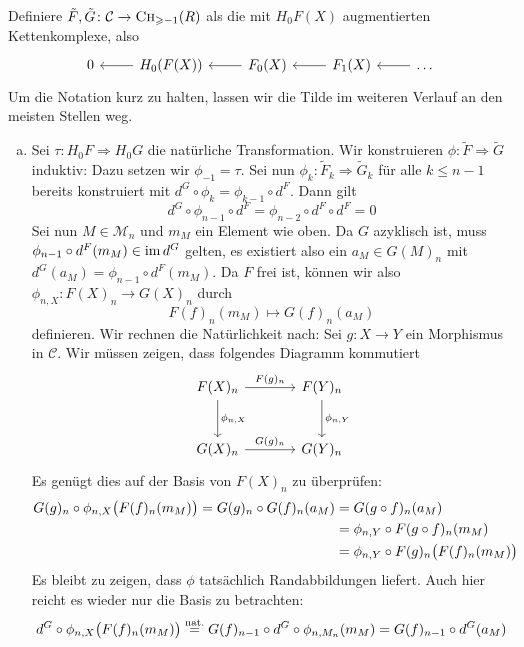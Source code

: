 \begin{beweis}
	Definiere $\tilde{F},\tilde{G} \colon \mathcal{C} \to \CH_{\ge -1}(R)$ als die mit $H_0 F(X)$ augmentierten Kettenkomplexe, also 
	\[
		\begin{tikzcd}
			0 & \lar H_0(F(X)) & F_0(X) \lar & F_1(X) \lar & \ldots \lar
		\end{tikzcd}
	\]
	Um die Notation kurz zu halten, lassen wir die Tilde im weiteren Verlauf an den meisten Stellen weg.
	\begin{enumerate}[a)]
		\item Sei $\tau \colon H_0 F \Rightarrow H_0 G$ die natürliche Transformation.
		Wir konstruieren $\phi \colon \tilde{F}\Rightarrow \tilde{G}$ induktiv:
		Dazu setzen wir $\phi_{-1} = \tau$.
		Sei nun $\phi_k \colon \tilde{F}_k \Rightarrow \tilde{G}_k$ für alle $k \le n-1$ bereits konstruiert mit $d^{G} \circ \phi_k = \phi_{k-1} \circ d^{F}$.
		Dann gilt
		\[
			d^{G} \circ  \phi_{n-1} \circ d^{F} = \phi_{n-2} \circ d^{F} \circ d^{F} =0
		\]
		Sei nun $M \in \mathcal{M}_n$ und $m_M$ ein Element wie oben.
		Da $G$ azyklisch ist, muss $\phi_{n-1} \circ d^{F}(m_M) \in \im d^{G}$ gelten, es existiert also ein $a_M \in G(M)_n$ mit $d^{G}(a_M) = \phi_{n-1} \circ d^{F}(m_M)$.
		Da $F$ frei ist, können wir also $\phi_{n,X} \colon  F(X)_n \to G(X)_n$ durch
		\[
			F(f)_n(m_M) \longmapsto G(f)_n(a_M)
		\]
		definieren.
		Wir rechnen die Natürlichkeit nach:
		Sei $g \colon X \to Y$ ein Morphismus in $\mathcal{C}$.
		Wir müssen zeigen, dass folgendes Diagramm kommutiert
		\[
			\begin{tikzcd}[sep=large]
				F(X)_n \rar["F(g)_n"] \dar["\phi_{n,X}"] & F(Y)_n \dar["\phi_{n,Y}"] \\
				G(X)_n \rar["G(g)_n"] & G(Y)_n
			\end{tikzcd}
		\]
		Es genügt dies auf der Basis von $F(X)_n$ zu überprüfen:
		\begin{align}
			G(g)_n \circ \phi_{n,X} \enbrace[\big]{F(f)_n(m_M)} = G(g)_n \circ G(f)_{n} (a_M) &= G(g \circ f)_n (a_M) \\
			&= \phi_{n,Y} \circ F(g \circ f)_n (m_M) \\
			&= \phi_{n,Y} \circ F(g)_n \enbrace[\big]{F(f)_n(m_M)}
		\end{align}
		Es bleibt zu zeigen, dass $\phi$ tatsächlich Randabbildungen liefert.
		Auch hier reicht es wieder nur die Basis zu betrachten:
		\begin{align}
			d^G \circ \phi_{n,X} \enbrace[\big]{F(f)_n(m_M)} \StackText{nat.}{=} G(f)_{n-1} \circ d^G \circ \phi_{n,M_n}(m_M) &=  G(f)_{n-1} \circ d^G (a_M) \\

\end{align}
\end{enumerate}
\end{beweis}
